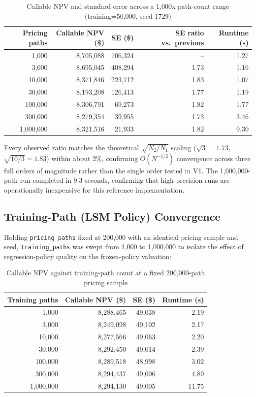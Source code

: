 \documentclass[conference]{IEEEtran}
\begin{document}
\begin{table}[!t]
\centering
\begin{tabular}{rrrrr}
\toprule
\textbf{Pricing paths} & \textbf{Callable NPV (\$)} & \textbf{SE (\$)} & \textbf{SE ratio vs.\ previous} & \textbf{Runtime (s)} \\
\midrule
1,000 & 8,705,088 & 706,324 & -- & 1.27 \\
3,000 & 8,695,045 & 408,294 & 1.73 & 1.16 \\
10,000 & 8,371,846 & 223,712 & 1.83 & 1.07 \\
30,000 & 8,193,208 & 126,413 & 1.77 & 1.19 \\
100,000 & 8,306,791 & 69,273 & 1.82 & 1.77 \\
300,000 & 8,279,354 & 39,955 & 1.73 & 3.46 \\
1,000,000 & 8,321,516 & 21,933 & 1.82 & 9.30 \\
\bottomrule
\end{tabular}
\caption{Callable NPV and standard error across a 1,000x path-count range (training=50,000, seed 1729)}
\end{table}

Every observed ratio matches the theoretical $\sqrt{N_2/N_1}$ scaling ($\sqrt{3}=1.73$, $\sqrt{10/3}=1.83$) within about 2\%, confirming $O(N^{-1/2})$ convergence across three full orders of magnitude rather than the single order tested in V1. The 1,000,000-path run completed in 9.3 seconds, confirming that high-precision runs are operationally inexpensive for this reference implementation.

\subsection{Training-Path (LSM Policy) Convergence}

Holding \texttt{pricing\_paths} fixed at 200,000 with an identical pricing sample and seed, \texttt{training\_paths} was swept from 1,000 to 1,000,000 to isolate the effect of regression-policy quality on the frozen-policy valuation:

\begin{table}[!t]
\centering
\begin{tabular}{rrrr}
\toprule
\textbf{Training paths} & \textbf{Callable NPV (\$)} & \textbf{SE (\$)} & \textbf{Runtime (s)} \\
\midrule
1,000 & 8,288,465 & 49,038 & 2.19 \\
3,000 & 8,249,098 & 49,102 & 2.17 \\
10,000 & 8,277,566 & 49,063 & 2.20 \\
30,000 & 8,292,450 & 49,014 & 2.39 \\
100,000 & 8,289,518 & 48,998 & 3.02 \\
300,000 & 8,294,437 & 49,006 & 4.89 \\
1,000,000 & 8,294,130 & 49,005 & 11.75 \\
\bottomrule
\end{tabular}
\caption{Callable NPV against training-path count at a fixed 200,000-path pricing sample}
\end{table}
\end{document}
